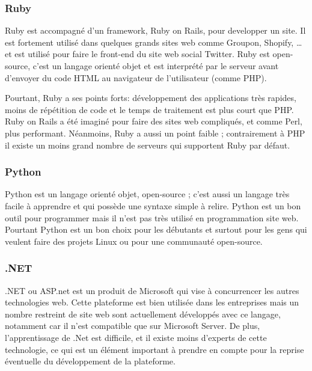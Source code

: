         \subsubsection{Ruby}
        \label{subsubsec:ruby}
        Ruby est accompagné d’un framework, Ruby on Rails, pour developper un site. Il est
        fortement utilisé dans quelques grands sites web comme Groupon, Shopify, … et est utilisé pour faire
        le front-end du site web social Twitter. Ruby est open-source, c’est un langage orienté objet et est
        interprété par le serveur avant d’envoyer du code HTML au navigateur de l’utilisateur (comme PHP).

        Pourtant, Ruby a ses points forts: développement des applications très rapides, moins de répétition
        de code et le temps de traitement est plus court que PHP. Ruby on Rails a été imaginé pour faire des
        sites web compliqués, et comme Perl, plus performant. Néanmoins, Ruby a aussi un point faible ;
        contrairement à PHP il existe un moins grand nombre de serveurs qui supportent Ruby par défaut.

        \subsubsection{Python}
        \label{subsubsec:python}
        Python est un langage orienté objet, open-source ; c’est aussi un langage très facile à apprendre
        et qui possède une syntaxe simple à relire. Python est un bon outil pour programmer mais il n’est
        pas très utilisé en programmation site web. Pourtant Python est un bon choix pour les débutants et
        surtout pour les gens qui veulent faire des projets Linux ou pour une communauté open-source.

        \subsubsection{.NET}
        \label{subsubsec:dotnet}
        .NET ou ASP.net est un produit de Microsoft qui vise à concurrencer les autres technologies web. Cette plateforme est bien utilisée dans les entreprises mais un nombre restreint de site web sont actuellement développés avec ce langage, notamment car il n’est compatible que sur Microsoft Server. De plus, l’apprentissage de .Net est difficile, et il existe moins d’experts de cette technologie, ce qui est un élément important à prendre en compte pour la reprise éventuelle du développement de la plateforme.



